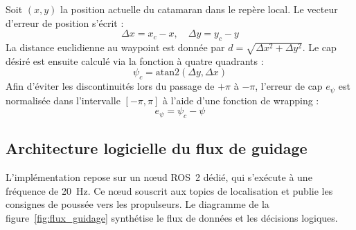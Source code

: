 \documentclass{rapportEILCO}
\begin{document}
	Soit $(x, y)$ la position actuelle du catamaran dans le repère local. Le vecteur d'erreur de position s'écrit :
	\begin{equation}
		\Delta x = x_c - x, \quad \Delta y = y_c - y
	\end{equation}
	La distance euclidienne au waypoint est donnée par $d = \sqrt{\Delta x^2 + \Delta y^2}$. Le cap désiré est ensuite calculé via la fonction à quatre quadrants :
	\begin{equation}
		\psi_c = \mathrm{atan2}(\Delta y, \Delta x)
	\end{equation}
	Afin d'éviter les discontinuités lors du passage de $+\pi$ à $-\pi$, l'erreur de cap $e_\psi$ est normalisée dans l'intervalle $[-\pi, \pi]$ à l'aide d'une fonction de wrapping :
	\begin{equation}
		e_\psi = \psi_c - \psi
	\end{equation}
	
	\subsection{Architecture logicielle du flux de guidage}
	L'implémentation repose sur un nœud ROS~2 dédié, qui s'exécute à une fréquence de 20~Hz. Ce nœud souscrit aux topics de localisation et publie les consignes de poussée vers les propulseurs. Le diagramme de la figure~\ref{fig:flux_guidage} synthétise le flux de données et les décisions logiques.
	
\end{document}
